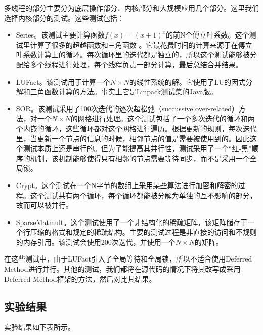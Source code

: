 多线程的部分主要分为底层操作部分、内核部分和大规模应用几个部分。这里我们选择内核部分的测试。这些测试包括：

\begin{itemize}
	\item Series。该测试主要计算函数$f(x) = (x + 1)^x$的前N个傅立叶系数。这个测试里计算了很多的超越函数和三角函数 。它最花费时间的计算来源于在傅立叶系数计算上的循环。每次循环里的迭代都是独立的，所以这个测试能够被分配给多个线程进行处理，每个线程负责一部分计算，最后总结合并结果。
	\item LUFact。该测试用于计算一个$N \times N$的线性系统的解。它使用了LU的因式分解和三角函数计算的方法。事实上它是Linpack测试集的Java版。
	\item SOR。该测试采用了100次迭代的逐次超松弛（succussive over-related）方法，对一个$N \times N$的网格进行处理。这个测试包括了一个多次迭代的循环和两个内嵌的循环，这些循环都对这个网格进行遍历。根据更新的规则，每次迭代里，当更新一个节点的信息的时候，相邻节点的值是需要被使用到的。因此这个测试本质上还是串行的。但为了能提高其并行性，测试采用了一个“红-黑”顺序的机制，该机制能够使得只有相邻的节点需要等待同步，而不是采用一个全局锁。
	\item Crypt。这个测试在一个N字节的数组上采用某些算法进行加密和解密的过程。这个测试共有两个循环，每个循环都能被分解为单独的互不影响的部分，故而可以被并行。
	\item SparseMatmult。这个测试使用了一个非结构化的稀疏矩阵，该矩阵储存于一个行压缩的格式和规定的稀疏结构。主要的测试过程是非直接的访问和不规则的内存引用。该测试会使用200次迭代，并使用一个$N \times N$的矩阵。
\end{itemize}

在这些测试中，由于LUFact引入了全局等待和全局锁，所以不适合使用Deferred Method进行并行。其他的测试，我们都将在源代码的情况下将其改写成采用Deferred Method框架的方法，然后对比其结果。

\subsection{实验结果}

实验结果如下表所示。

